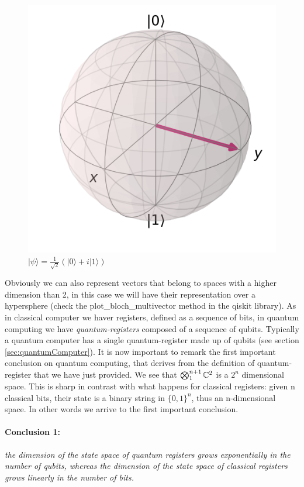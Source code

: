 \documentclass[english]{article}
\newcommand{\sbigotimes}{%
	\mathop{\mathchoice{\textstyle\bigotimes}{\bigotimes}{\bigotimes}{\bigotimes}}%
}
\begin{document}
\begin{enumerate}
\begin{figure}[h]
\begin{minipage}{0.4\textwidth}
							\includegraphics[scale=0.4]{yket.png}
							\caption{$|\psi\rangle = \frac{1}{\sqrt{2}}(|0\rangle+i|1\rangle)$}
						\end{minipage}
					\end{figure}
				\end{enumerate}
			
			Obviously we can also represent vectors that belong to spaces with a higher dimension than 2, in this case we will have their representation over a hypersphere (check the plot\_bloch\_multivector method in the qiskit library). As in classical computer we haver registers, defined as a sequence of bits, in quantum computing we have \emph{quantum-registers} composed of a sequence of qubits. Typically a quantum computer has a single quantum-register made up of qubits (see section \ref{sec:quantumComputer}). It is now important to remark the first important conclusion on quantum computing, that derives from the definition of quantum-register that we have just provided. We see that $\sbigotimes_1^{n+1} \mathbb{C}^{2}$ is a $2^{n}$ dimensional space. This is sharp in contrast with what happens for classical registers: given n classical bits, their state is a binary string in $\{0,1\}^{n}$, thus an n-dimensional space. In other words we arrive to the first important conclusion.
			
			\paragraph{Conclusion 1:} \emph{the dimension of the state space of quantum registers grows exponentially in the number of qubits, whereas the dimension of the state space of classical registers grows linearly in the number of bits.}
			
\end{document}
